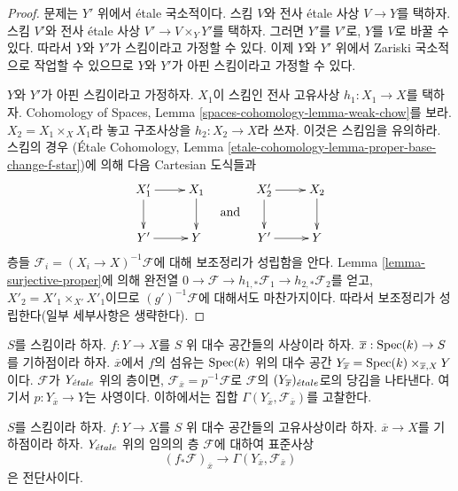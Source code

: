 \begin{proof}
문제는 $Y'$ 위에서 \'etale 국소적이다. 스킴 $V$와 전사
\'etale 사상 $V \to Y$를 택하자. 스킴 $V'$와 전사
\'etale 사상 $V' \to V \times_Y Y'$를 택하자.
그러면 $Y'$를 $V'$로, $Y$를 $V$로 바꿀 수 있다.
따라서 $Y$와 $Y'$가 스킴이라고 가정할 수 있다.
이제 $Y$와 $Y'$ 위에서 Zariski 국소적으로 작업할 수 있으므로
$Y$와 $Y'$가 아핀 스킴이라고 가정할 수 있다.

\medskip\noindent
$Y$와 $Y'$가 아핀 스킴이라고 가정하자.
$X_1$이 스킴인 전사 고유사상 $h_1 : X_1 \to X$를 택하자.
Cohomology of Spaces, Lemma
\ref{spaces-cohomology-lemma-weak-chow}를 보라.
$X_2 = X_1 \times_X X_1$라 놓고 구조사상을
$h_2 : X_2 \to X$라 쓰자. 이것은 스킴임을 유의하라.
스킴의 경우
(\'Etale Cohomology, Lemma
\ref{etale-cohomology-lemma-proper-base-change-f-star})에 의해
다음 Cartesian 도식들과
$$
\vcenter{
\xymatrix{
X'_1 \ar[r] \ar[d] & X_1 \ar[d] \\
Y' \ar[r] & Y
}
}
\quad\text{and}\quad
\vcenter{
\xymatrix{
X'_2 \ar[r] \ar[d] & X_2 \ar[d] \\
Y' \ar[r] & Y
}
}
$$
층들 $\mathcal{F}_i = (X_i \to X)^{-1}\mathcal{F}$에 대해
보조정리가 성립함을 안다.
Lemma \ref{lemma-surjective-proper}에 의해 완전열
$0 \to \mathcal{F} \to h_{1, *}\mathcal{F}_1 \to h_{2, *}\mathcal{F}_2$를
얻고, $X'_2 = X'_1 \times_{X'} X'_1$이므로
$(g')^{-1}\mathcal{F}$에 대해서도 마찬가지이다.
따라서 보조정리가 성립한다(일부 세부사항은 생략한다).
\end{proof}

\noindent
$S$를 스킴이라 하자.
$f : Y \to X$를 $S$ 위 대수 공간들의 사상이라 하자.
$\overline{x} : \mathop{\mathrm{Spec}}(k) \to S$를 기하점이라 하자.
$\overline{x}$에서 $f$의 섬유는 $\mathop{\mathrm{Spec}}(k)$ 위의 대수 공간
$Y_{\overline{x}} = \mathop{\mathrm{Spec}}(k) \times_{\overline{x}, X} Y$이다.
$\mathcal{F}$가 $Y_{\acute{e}tale}$ 위의 층이면,
$\mathcal{F}_{\overline{x}} = p^{-1}\mathcal{F}$로
$\mathcal{F}$의 $(Y_{\overline{x}})_{\acute{e}tale}$로의 당김을 나타낸다.
여기서 $p : Y_{\overline{x}} \to Y$는 사영이다.
이하에서는 집합
$\Gamma(Y_{\overline{x}}, \mathcal{F}_{\overline{x}})$를 고찰한다.

\begin{lemma}
\label{lemma-proper-pushforward-stalk}
$S$를 스킴이라 하자.
$f : Y \to X$를 $S$ 위 대수 공간들의 고유사상이라 하자.
$\overline{x} \to X$를 기하점이라 하자.
$Y_{\acute{e}tale}$ 위의 임의의 층 $\mathcal{F}$에 대하여 표준사상
$$
(f_*\mathcal{F})_{\overline{x}} \longrightarrow
\Gamma(Y_{\overline{x}}, \mathcal{F}_{\overline{x}})
$$
은 전단사이다.
\end{lemma}

